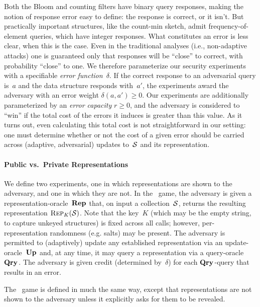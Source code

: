 Both the Bloom and counting filters have binary query responses,
making the notion of response error easy to define: the response is
correct, or it isn't.  But practically important structures, like the count-min sketch, admit
frequency-of-element queries, which have integer responses.  What
constitutes an error is less clear, when this is the case.
Even in the traditional analyses (i.e., non-adaptive attacks) one is
guaranteed only that responses will be ``close'' to correct,
with probability ``close'' to one. 
We therefore parameterize our security experiments with a specifiable
\emph{error function}~$\delta$.  If the correct response to an adversarial
query is~$a$ and the data structure responds with~$a'$, the
experiments award the adversary with an error weight $\delta(a,a') \geq 0$.
%
Our experiments are additionally parameterized by an \emph{error capacity}
$r\geq0$, and the adversary is considered to ``win'' if the total cost of the
errors it induces is greater than this value.  As it turns out, even calculating
this total cost is not straightforward in our setting: one must determine whether
or not the cost of a given error should be carried across (adaptive,
adversarial) updates to~$\mathcal{S}$ and its representation.

\paragraph{Public vs.\ Private Representations}
We define two experiments, one in which representations are shown to
the adversary, and one in which they are not.
%
In the \errep\ game, the adversary is given a
representation-oracle~$\textup{\textbf{Rep}}\hspace{0.5pt}$ that, on input a collection~$\mathcal{S}$,
returns the resulting representation $\textnormal{\textsc{Rep}}_K(\mathcal{S})$. Note that the
key~$K$ (which may be the empty string, to capture unkeyed structures)
is fixed across all calls; however, per-representation randomness
(e.g. salts) may be present.  The adversary is permitted to
(adaptively) update any established representation via an
update-oracle~$\textup{\textbf{Up}}\hspace{0.5pt}$ and, at any time, it may query a representation
via a query-oracle~$\textup{\textbf{Qry}}\hspace{0.5pt}$. The adversary is given credit (determined
by~$\delta$) for each $\textup{\textbf{Qry}}\hspace{0.5pt}$-query that results in an error.

The \erreps\ game is defined in much the same way, except that representations
are not shown to the adversary unless it explicitly asks for them to be
revealed.


